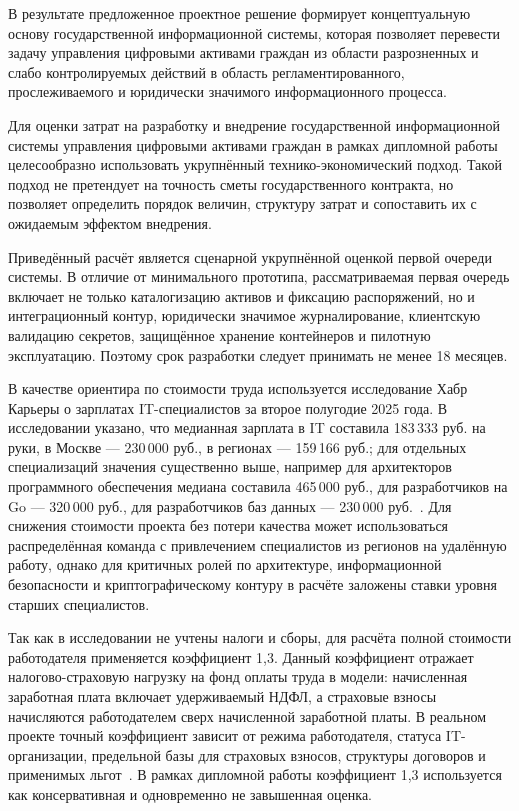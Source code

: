 В результате предложенное проектное решение формирует концептуальную основу государственной информационной системы, которая позволяет перевести задачу управления цифровыми активами граждан из области разрозненных и слабо контролируемых действий в область регламентированного, прослеживаемого и юридически значимого информационного процесса.


Для оценки затрат на разработку и внедрение государственной информационной системы управления цифровыми активами граждан в рамках дипломной работы целесообразно использовать укрупнённый технико-экономический подход. Такой подход не претендует на точность сметы государственного контракта, но позволяет определить порядок величин, структуру затрат и сопоставить их с ожидаемым эффектом внедрения.

Приведённый расчёт является сценарной укрупнённой оценкой первой очереди системы. В отличие от минимального прототипа, рассматриваемая первая очередь включает не только каталогизацию активов и фиксацию распоряжений, но и интеграционный контур, юридически значимое журналирование, клиентскую валидацию секретов, защищённое хранение контейнеров и пилотную эксплуатацию. Поэтому срок разработки следует принимать не менее 18 месяцев.

В качестве ориентира по стоимости труда используется исследование Хабр Карьеры о зарплатах IT-специалистов за второе полугодие 2025 года. В исследовании указано, что медианная зарплата в IT составила 183\,333 руб. на руки, в Москве --- 230\,000 руб., в регионах --- 159\,166 руб.; для отдельных специализаций значения существенно выше, например для архитекторов программного обеспечения медиана составила 465\,000 руб., для разработчиков на Go --- 320\,000 руб., для разработчиков баз данных --- 230\,000 руб.~\cite{habrCareerSalariesH2_2025}. Для снижения стоимости проекта без потери качества может использоваться распределённая команда с привлечением специалистов из регионов на удалённую работу, однако для критичных ролей по архитектуре, информационной безопасности и криптографическому контуру в расчёте заложены ставки уровня старших специалистов.

Так как в исследовании не учтены налоги и сборы, для расчёта полной стоимости работодателя применяется коэффициент 1{,}3. Данный коэффициент отражает налогово-страховую нагрузку на фонд оплаты труда в модели: начисленная заработная плата включает удерживаемый НДФЛ, а страховые взносы начисляются работодателем сверх начисленной заработной платы. В реальном проекте точный коэффициент зависит от режима работодателя, статуса IT-организации, предельной базы для страховых взносов, структуры договоров и применимых льгот~\cite{fnsInsuranceRates2026}. В рамках дипломной работы коэффициент 1{,}3 используется как консервативная и одновременно не завышенная оценка.

